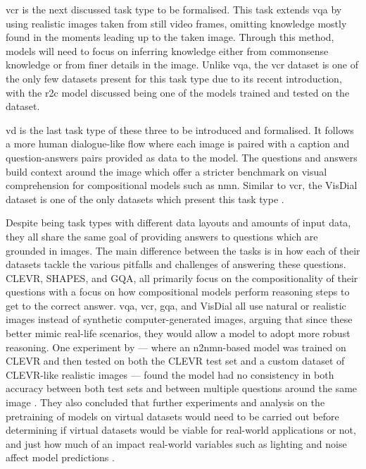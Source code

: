 \gls{vcr} is the next discussed task type to be formalised\cite{zellers_recognition_2019}.
This task extends \gls{vqa} by using realistic images taken from still video frames, omitting knowledge mostly found in the moments leading up to the taken image.
Through this method, models will need to focus on inferring knowledge either from commonsense knowledge or from finer details in the image.
Unlike \gls{vqa}, the \gls{vcr} dataset\cite{zellers_recognition_2019} is one of the only few datasets present for this task type due to its recent introduction, with the \gls{r2c} model discussed being one of the models trained and tested on the dataset.

\gls{vd} is the last task type of these three to be introduced and formalised\cite{das_visual_2019}.
It follows a more human dialogue-like flow where each image is paired with a caption and question-answers pairs provided as data to the model.
The questions and answers build context around the image which offer a stricter benchmark on visual comprehension for compositional models such as \gls{nmn}.
Similar to \gls{vcr}, the VisDial dataset is one of the only datasets which present this task type \cite{das_visual_2019}.

Despite being task types with different data layouts and amounts of input data, they all share the same goal of providing answers to questions which are grounded in images.
The main difference between the tasks is in how each of their datasets tackle the various pitfalls and challenges of answering these questions.
CLEVR, SHAPES, and GQA, all primarily focus on the compositionality of their questions with a focus on how compositional models perform reasoning steps to get to the correct answer\cite{andreas_neural_2016,johnson_clevr_2016,hudson_gqa_2019}.
\gls{vqa}, \gls{vcr}, \gls{gqa}, and VisDial all use natural or realistic images instead of synthetic computer-generated images, arguing that since these better mimic real-life scenarios, they would allow a model to adopt more robust reasoning\cite{agrawal_vqa_2016,hudson_gqa_2019,zellers_recognition_2019,das_visual_2019}.
One experiment by \cite{sejnova_compositional_2018} --- where an \gls{n2nmn}-based model was trained on CLEVR and then tested on both the CLEVR test set and a custom dataset of CLEVR-like realistic images --- found the model had no consistency in both accuracy between both test sets and between multiple questions around the same image \cite{sejnova_compositional_2018}.
They also concluded that further experiments and analysis on the pretraining of models on virtual datasets would need to be carried out before determining if virtual datasets would be viable for real-world applications or not, and just how much of an impact real-world variables such as lighting and noise affect model predictions \cite{sejnova_compositional_2018}.

